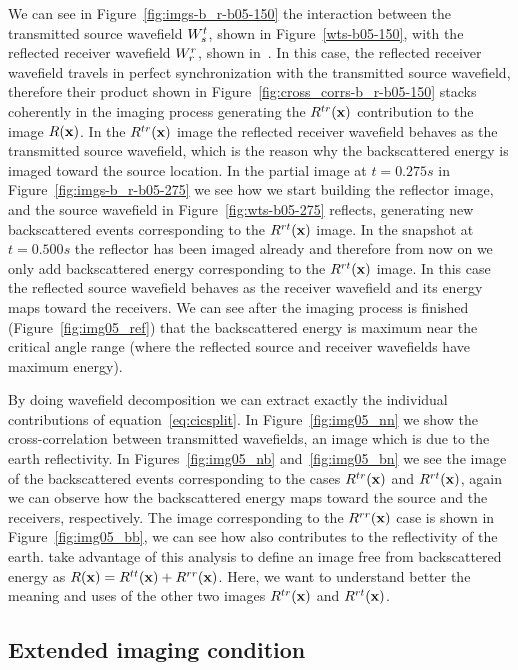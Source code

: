 We can see in Figure~\ref{fig:imgs-b_r-b05-150} the interaction between the transmitted source wavefield ${W_s^t}$, shown in Figure~\ref{wts-b05-150}, with 
the reflected receiver wavefield ${W_r^r}$, shown in~. In this case, the reflected receiver wavefield travels in perfect synchronization
with the transmitted source wavefield, therefore their product shown in Figure~\ref{fig:cross_corrs-b_r-b05-150} stacks coherently in the imaging 
process generating the $R^{tr}({\bf x})$ contribution to the image $R({\bf x})$. In the $R^{tr}({\bf x})$ image the reflected 
receiver wavefield behaves as the transmitted source wavefield, which is the reason why the backscattered energy is imaged toward the source location. 
%
%
 In the partial image at $t=0.275s$ in Figure~\ref{fig:imgs-b_r-b05-275} we see how we start building the reflector image,
and the source wavefield in Figure~\ref{fig:wts-b05-275} reflects, generating new backscattered events
corresponding to the  $R^{rt}({\bf x})$ image.
%
%
In the snapshot at $t=0.500s$ the reflector has been imaged already and 
therefore from now on we only add backscattered energy corresponding to the $R^{rt}({\bf x})$ image. In this case the 
reflected source wavefield behaves as the receiver wavefield and its energy maps toward the receivers. We can see after
 the imaging process is finished (Figure~\ref{fig:img05_ref}) that the backscattered energy is maximum near the critical
 angle range (where the reflected source and receiver wavefields have maximum energy).

By doing wavefield decomposition we can extract exactly the individual contributions of equation~\ref{eq:cicsplit}. In 
Figure~\ref{fig:img05_nn} we show the cross-correlation between transmitted wavefields, an image which is due to the
earth reflectivity. In Figures~\ref{fig:img05_nb} and~\ref{fig:img05_bn} we see the image of the backscattered
events corresponding to the cases $R^{tr}({\bf x})$ and $R^{rt}({\bf x})$, again we can observe how the backscattered energy
maps toward the source and the receivers, respectively. The image corresponding to the $R^{rr}({\bf x})$ case is shown in 
Figure~\ref{fig:img05_bb}, we can see how also contributes to the reflectivity of the earth. \cite{fei:3130} take 
advantage of this analysis to define an image free from backscattered energy as $R({\bf x})=R^{tt}({\bf x})+R^{rr}({\bf x})$. Here,
we want to understand better the meaning and uses of the other two images $R^{tr}({\bf x})$ and $R^{rt}({\bf x})$.


\subsection{Extended imaging condition}

